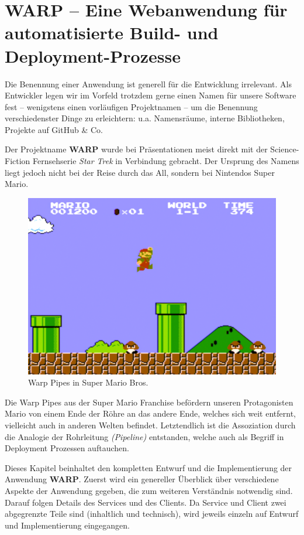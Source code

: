 
\chapter{WARP – Eine Webanwendung für automatisierte Build- und Deployment-Prozesse}

Die Benennung einer Anwendung ist generell für die Entwicklung irrelevant. Als Entwickler legen wir im Vorfeld trotzdem gerne einen Namen für unsere Software fest – wenigstens einen vorläufigen Projektnamen – um die Benennung verschiedenster Dinge zu erleichtern: u.a. Namensräume, interne Bibliotheken, Projekte auf GitHub \& Co.

Der Projektname \textbf{WARP} wurde bei Präsentationen meist direkt mit der Science-Fiction Fernsehserie \emph{Star Trek} in Verbindung gebracht. Der Ursprung des Namens liegt jedoch nicht bei der Reise durch das All, sondern bei Nintendos Super Mario.

\begin{figure}[H]
  \caption{Warp Pipes in Super Mario Bros.}
  \label{fig:super-mario-warp-pipes}
  \centering
    \includegraphics[width=.55\textwidth]{assets/mario-pipes}
\end{figure}

Die Warp Pipes aus der Super Mario Franchise befördern unseren Pro\-ta\-go\-nisten Mario von einem Ende der Röhre an das andere Ende, welches sich weit entfernt, vielleicht auch in anderen Welten befindet. Letztendlich ist die Assoziation durch die Analogie der Rohrleitung \emph{(Pipeline)} entstanden, welche auch als Begriff in Deployment Prozessen auftauchen.

Dieses Kapitel beinhaltet den kompletten Entwurf und die Implementierung der Anwendung \textbf{WARP}. Zuerst wird ein genereller Überblick über verschiedene Aspekte der Anwendung gegeben, die zum weiteren Verständnis notwendig sind. Darauf folgen Details des Services und des Clients. Da Service und Client zwei abgegrenzte Teile sind (inhaltlich und technisch), wird jeweils einzeln auf Entwurf und Implementierung eingegangen.

